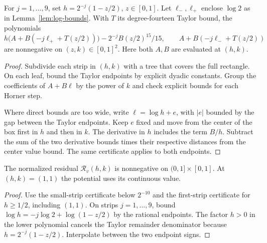 \begin{lemma}
\label{cert:odd-b-strips}
\leanok
For $j=1,\dots,9$, set $h=2^{-j}(1-z/2)$, $z\in[0,1]$.
Let $\ell_-,\ell_+$ enclose $\log 2$ as in Lemma~\ref{lem:log-bounds}.
With $T$ its degree-fourteen Taylor bound, the polynomials
\[
 h\big(A+B(-j\ell_++T(z/2))\big)
   -2^{-j}B(z/2)^{15}/15,
 \qquad A+B(-j\ell_-+T(z/2))
\]
are nonnegative on $(z,k)\in[0,1]^2$. Here both $A,B$ are evaluated at $(h,k)$.
\end{lemma}
\begin{proof}
\leanok
Subdivide each strip in $(h,k)$ with a tree that covers the full rectangle.
On each leaf, bound the Taylor endpoints by explicit dyadic constants.
Group the coefficients of $A+B\ell$ by the power of $k$ and check
explicit bounds for each Horner step.

Where direct bounds are too wide, write $\ell=\log h+e$, with $|e|$
bounded by the gap between the Taylor endpoints. Keep $e$ fixed and
move from the center of the box first in $h$ and then in $k$. The
derivative in $h$ includes the term $B/h$. Subtract the sum of the two
derivative bounds times their respective distances from the center
value bound. The same certificate applies to both endpoints.
\end{proof}

\begin{lemma}
\label{cert:odd-b}
\leanok
The normalized residual $\mathcal R_v(h,k)$ is nonnegative on
$(0,1]\times[0,1]$. At $(h,k)=(1,1)$ the potential uses its continuous value.
\end{lemma}

\begin{proof}
\leanok
Use the small-strip certificate below $2^{-10}$ and the first-strip
certificate for $h\ge 1/2$, including $(1,1)$. On strips $j=1,\dots,9$,
bound $\log h=-j\log 2+\log(1-z/2)$ by the rational endpoints. The factor
$h>0$ in the lower polynomial cancels the Taylor remainder denominator
because $h=2^{-j}(1-z/2)$. Interpolate between the two endpoint signs.
\end{proof}

